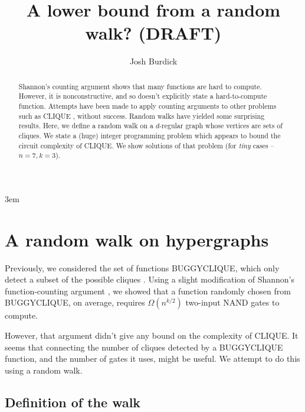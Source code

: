\documentclass[12pt]{article}
\theoremstyle{definition}
\begin{document}
\emergencystretch 3em
\title{A lower bound from a random walk? (DRAFT)}

\author{Josh Burdick}

\maketitle

\begin{abstract}

Shannon's counting argument \cite{shannon_counting} shows that many functions are hard to compute.
However, it is nonconstructive, and so doesn't explicitly state a
hard-to-compute function. Attempts have been made to apply counting arguments to other problems
such as CLIQUE \cite{buggyclique}, without success.
Random walks have yielded some surprising results.
Here, we define a random walk on a $d$-regular graph whose vertices are
sets of cliques. We state a (huge) integer programming
problem which appears to bound the circuit complexity of CLIQUE. We show solutions
of that problem (for {\em tiny} cases -- $n=7, k=3$).

\end{abstract}

\newpage

\tableofcontents

\vspace{5mm}


\section{A random walk on hypergraphs} \label{se:countingBound}

Previously, we considered the set of functions BUGGYCLIQUE, which
only detect a subset of the possible cliques \cite{buggyclique}.
Using a slight modification of Shannon's
function-counting argument \cite{shannon_synthesis_1949},
we showed that a function randomly chosen from BUGGYCLIQUE,
on average, requires $\Omega(n^{k/2})$ two-input NAND gates to compute.

However, that argument didn't give any bound on the complexity of CLIQUE.
It seems that connecting the number of cliques detected by a BUGGYCLIQUE
function, and the number of gates it uses, might be useful. We attempt
to do this using a random walk.

\subsection{Definition of the walk}
\end{document}
